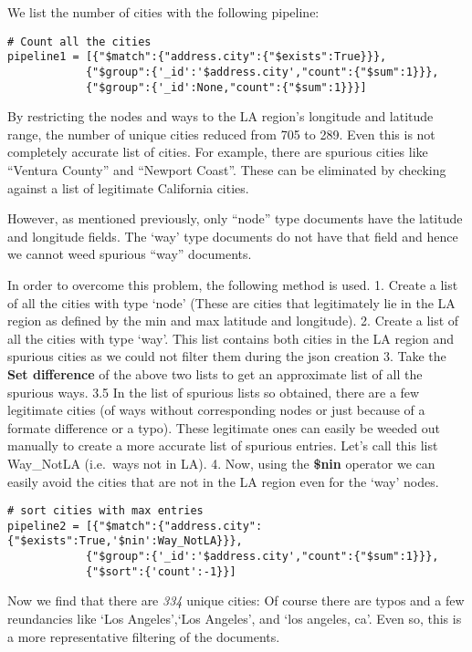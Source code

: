 \documentclass[12pt]{article}
\begin{document}
We list the number of cities with the following pipeline:

\begin{verbatim}
# Count all the cities
pipeline1 = [{"$match":{"address.city":{"$exists":True}}},
            {"$group":{'_id':'$address.city',"count":{"$sum":1}}},
            {"$group":{'_id':None,"count":{"$sum":1}}}] 
\end{verbatim}

By restricting the nodes and ways to the LA region's longitude and
latitude range, the number of unique cities reduced from 705 to 289.
Even this is not completely accurate list of cities. For example, there
are spurious cities like ``Ventura County'' and ``Newport Coast''. These
can be eliminated by checking against a list of legitimate California
cities.

However, as mentioned previously, only ``node'' type documents have the
latitude and longitude fields. The `way' type documents do not have that
field and hence we cannot weed spurious ``way'' documents.

In order to overcome this problem, the following method is used. 1.
Create a list of all the cities with type `node' (These are cities that
legitimately lie in the LA region as defined by the min and max latitude
and longitude). 2. Create a list of all the cities with type `way'. This
list contains both cities in the LA region and spurious cities as we
could not filter them during the json creation 3. Take the \textbf{Set
difference} of the above two lists to get an approximate list of all the
spurious ways. 3.5 In the list of spurious lists so obtained, there are
a few legitimate cities (of ways without corresponding nodes or just
because of a formate difference or a typo). These legitimate ones can
easily be weeded out manually to create a more accurate list of spurious
entries. Let's call this list Way\_NotLA (i.e.~ways not in LA). 4. Now,
using the \textbf{\$nin} operator we can easily avoid the cities that
are not in the LA region even for the `way' nodes.

\begin{verbatim}
# sort cities with max entries
pipeline2 = [{"$match":{"address.city":{"$exists":True,'$nin':Way_NotLA}}},
            {"$group":{'_id':'$address.city',"count":{"$sum":1}}},
            {"$sort":{'count':-1}}] 
\end{verbatim}

Now we find that there are \emph{334} unique cities: Of course there are
typos and a few reundancies like `Los Angeles',`Los \textbar{}Angeles',
and `los angeles, ca'. Even so, this is a more representative filtering
of the documents.
\end{document}
